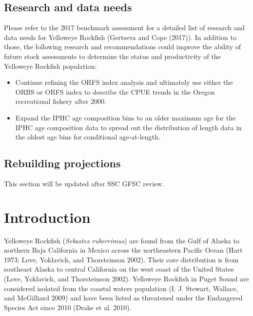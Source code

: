\documentclass[
]{scrartcl}
\providecommand{\tightlist}{%
  \setlength{\itemsep}{0pt}\setlength{\parskip}{0pt}}\usepackage{longtable,booktabs,array}
\begin{document}
\subsection*{Research and data needs}\label{research-and-data-needs}

Please refer to the 2017 benchmark assessment for a detailed list of
research and data needs for Yelloweye Rockfish (Gertseva and Cope
(2017)). In addition to those, the following research and
recommendations could improve the ability of future stock assessments to
determine the status and productivity of the Yelloweye Rockfish
population:

\begin{itemize}
\tightlist
\item
  Continue refining the ORFS index analysis and ultimately use either
  the ORBS or ORFS index to describe the CPUE trends in the Oregon
  recreational fishery after 2000.
\item
  Expand the IPHC age composition bins to an older maximum age for the
  IPHC age composition data to spread out the distribution of length
  data in the oldest age bins for conditional age-at-length.
\end{itemize}

\subsection*{Rebuilding projections}\label{rebuilding-projections}

This section will be updated after SSC GFSC review.

\pagebreak

\newpage{}

\setlength{\parskip}{5mm plus1mm minus1mm}
\setcounter{page}{1}
\setcounter{section}{0}
\renewcommand{\thefigure}{\arabic{figure}}
\renewcommand{\thetable}{\arabic{table}}
\setcounter{table}{0}
\setcounter{figure}{0}

\section{Introduction}\label{introduction}

Yelloweye Rockfish (\emph{Sebastes ruberrimus}) are found from the Gulf
of Alaska to northern Baja California in Mexico across the northeastern
Pacific Ocean (Hart 1973; Love, Yoklavich, and Thorsteinson 2002). Their
core distribution is from southeast Alaska to central California on the
west coast of the United States (Love, Yoklavich, and Thorsteinson
2002). Yelloweye Rockfish in Puget Sound are considered isolated from
the coastal waters population (I. J. Stewart, Wallace, and McGilliard
2009) and have been listed as threatened under the Endangered Species
Act since 2010 (Drake et al. 2010).
\end{document}
